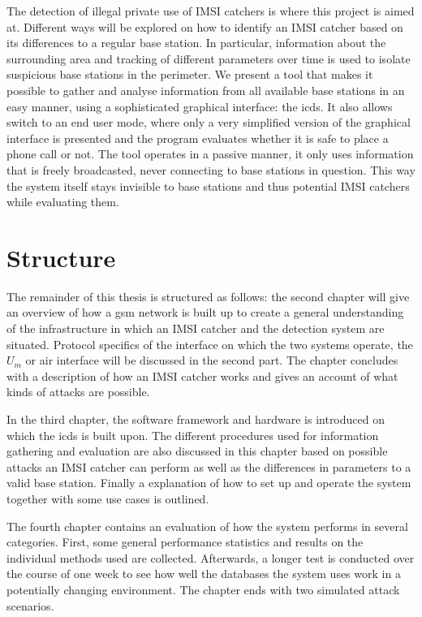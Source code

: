 The detection of illegal private use of IMSI catchers is where this project is aimed at.
Different ways will be explored on how to identify an IMSI catcher based on its differences to a regular base station.
In particular, information about the surrounding area and tracking of different parameters over time is used to isolate suspicious base stations in the perimeter.
We present a tool that makes it possible to gather and analyse information from all available base stations in an easy manner, using a sophisticated graphical interface: the \gls{icds}.
It also allows switch to an end user mode, where only a very simplified version of the graphical interface is presented and the program evaluates whether it is safe to place a phone call or not.
The tool operates in a passive manner, \ie it only uses information that is freely broadcasted, never connecting to base stations in question.
This way the system itself stays invisible to base stations and thus potential IMSI catchers while evaluating them.

\section{Structure}
The remainder of this thesis is structured as follows: the second chapter will give an overview of how a \gls{gsm} network is built up to create a general understanding of the infrastructure in which an IMSI catcher and the detection system are situated.
Protocol specifics of the interface on which the two systems operate, the $U_m$ or air interface will be discussed in the second part.
The chapter concludes with a description of how an IMSI catcher works and gives an account of what kinds of attacks are possible.

In the third chapter, the software framework and hardware is introduced on which the \gls{icds} is built upon.
The different procedures used for information gathering and evaluation are also discussed in this chapter based on possible attacks an IMSI catcher can perform as well as the differences in parameters to a valid base station.
Finally a explanation of how to set up and operate the system together with some use cases is outlined.

The fourth chapter contains an evaluation of how the system performs in several categories.
First, some general performance statistics and results on the individual methods used are collected.
Afterwards, a longer test is conducted over the course of one week to see how well the databases the system uses work in a potentially changing environment.
The chapter ends with two simulated attack scenarios.

